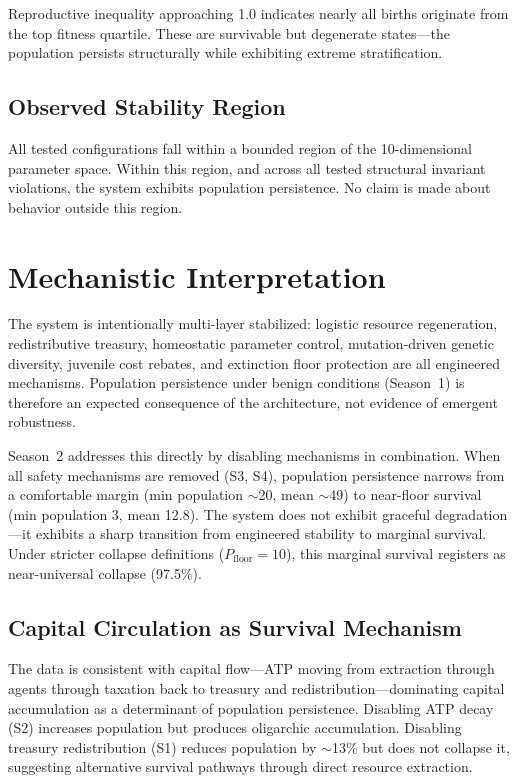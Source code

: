 \documentclass[11pt,a4paper]{article}
\begin{document}
Reproductive inequality approaching 1.0 indicates nearly all births originate from the top fitness quartile. These are survivable but degenerate states---the population persists structurally while exhibiting extreme stratification.

\subsection{Observed Stability Region}

All tested configurations fall within a bounded region of the 10-dimensional parameter space. Within this region, and across all tested structural invariant violations, the system exhibits population persistence. No claim is made about behavior outside this region.

\section{Mechanistic Interpretation}

The system is intentionally multi-layer stabilized: logistic resource regeneration, redistributive treasury, homeostatic parameter control, mutation-driven genetic diversity, juvenile cost rebates, and extinction floor protection are all engineered mechanisms. Population persistence under benign conditions (Season~1) is therefore an expected consequence of the architecture, not evidence of emergent robustness.

Season~2 addresses this directly by disabling mechanisms in combination. When all safety mechanisms are removed (S3, S4), population persistence narrows from a comfortable margin (min population $\sim$20, mean $\sim$49) to near-floor survival (min population 3, mean 12.8). The system does not exhibit graceful degradation---it exhibits a sharp transition from engineered stability to marginal survival. Under stricter collapse definitions ($P_{\text{floor}} = 10$), this marginal survival registers as near-universal collapse (97.5\%).

\subsection{Capital Circulation as Survival Mechanism}

The data is consistent with capital flow---ATP moving from extraction through agents through taxation back to treasury and redistribution---dominating capital accumulation as a determinant of population persistence. Disabling ATP decay (S2) increases population but produces oligarchic accumulation. Disabling treasury redistribution (S1) reduces population by $\sim$13\% but does not collapse it, suggesting alternative survival pathways through direct resource extraction.
\end{document}
